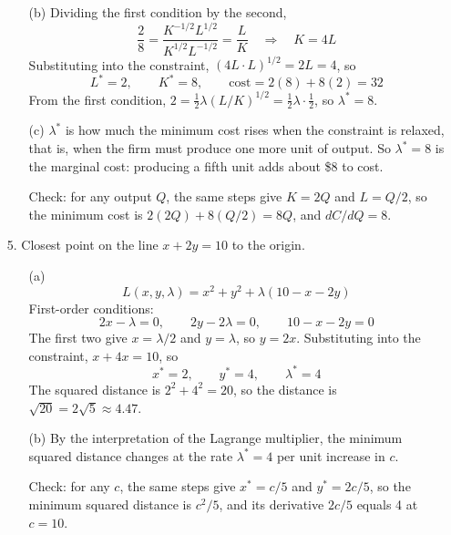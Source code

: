 \begin{enumerate}
\begin{enumerate}
\item[(b)] Dividing the first condition by the second,
\[\frac{2}{8} = \frac{K^{-1/2} L^{1/2}}{K^{1/2} L^{-1/2}} = \frac{L}{K} \quad \Rightarrow \quad K = 4L\]
Substituting into the constraint, $(4L \cdot L)^{1/2} = 2L = 4$, so
\[L^* = 2, \qquad K^* = 8, \qquad \text{cost} = 2(8) + 8(2) = 32\]
From the first condition, $2 = \tfrac{1}{2} \lambda (L/K)^{1/2} = \tfrac{1}{2} \lambda \cdot \tfrac{1}{2}$, so $\lambda^* = 8$.

\item[(c)] $\lambda^*$ is how much the minimum cost rises when the constraint is relaxed, that is, when the firm must produce one more unit of output. So $\lambda^* = 8$ is the marginal cost: producing a fifth unit adds about \$8 to cost.

Check: for any output $Q$, the same steps give $K = 2Q$ and $L = Q/2$, so the minimum cost is $2(2Q) + 8(Q/2) = 8Q$, and $dC/dQ = 8$.
\end{enumerate}

\item[5.] Closest point on the line $x + 2y = 10$ to the origin.
\begin{enumerate}
\item[(a)] \[L(x, y, \lambda) = x^2 + y^2 + \lambda(10 - x - 2y)\]
First-order conditions:
\[2x - \lambda = 0, \qquad 2y - 2\lambda = 0, \qquad 10 - x - 2y = 0\]
The first two give $x = \lambda/2$ and $y = \lambda$, so $y = 2x$. Substituting into the constraint, $x + 4x = 10$, so
\[x^* = 2, \qquad y^* = 4, \qquad \lambda^* = 4\]
The squared distance is $2^2 + 4^2 = 20$, so the distance is $\sqrt{20} = 2\sqrt{5} \approx 4.47$.

\item[(b)] By the interpretation of the Lagrange multiplier, the minimum squared distance changes at the rate $\lambda^* = 4$ per unit increase in $c$.

Check: for any $c$, the same steps give $x^* = c/5$ and $y^* = 2c/5$, so the minimum squared distance is $c^2/5$, and its derivative $2c/5$ equals 4 at $c = 10$.
\end{enumerate}

\end{enumerate}
